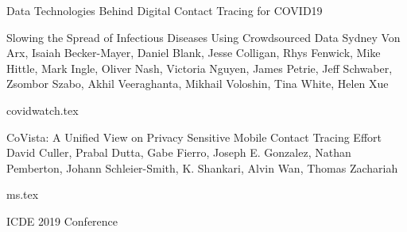 \documentclass[11pt]{article}
\begin{document}
\begin{bulletin}
\begin{articlesection}{Data Technologies Behind Digital Contact Tracing for COVID19}
\begin{article}
{Slowing the Spread of Infectious Diseases Using Crowdsourced Data}
{Sydney Von Arx, Isaiah Becker-Mayer, Daniel Blank, Jesse Colligan, Rhys Fenwick, Mike Hittle, Mark Ingle, Oliver Nash, Victoria Nguyen, James Petrie, Jeff Schwaber, Zsombor Szabo, Akhil Veeraghanta, Mikhail Voloshin, Tina White, Helen Xue}
\graphicspath{{submissions/covidwatch/}}
{covidwatch.tex}
\end{article}


\begin{article}
{CoVista: A Unified View on Privacy Sensitive Mobile Contact Tracing Effort}
{David Culler, Prabal Dutta, Gabe Fierro, Joseph E. Gonzalez, Nathan Pemberton, Johann Schleier-Smith, K. Shankari, Alvin Wan, Thomas Zachariah}
\graphicspath{{submissions/BerkeleyCovista/figs/}}
{ms.tex}
\end{article}


\end{articlesection}








\begin{callsection}
%
%
\begin{call}{ICDE 2019 Conference}
\end{call}
\end{callsection}

\end{bulletin}
\end{document}
